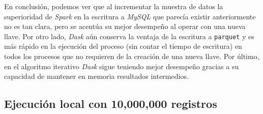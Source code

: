 En conclusión, podemos ver que al incrementar la muestra de datos la superioridad de \textit{Spark} en la escritura a \textit{MySQL} que parecía existir anteriormente no es tan clara, pero se acentúa su mejor desempeño al operar con una nueva llave. Por otro lado, \textit{Dask} aún conserva la ventaja de la escritura a \texttt{parquet} y es más rápido en la ejecución del proceso (sin contar el tiempo de escritura) en todos los procesos que no requieren de la creación de una nueva llave. Por último, en el algoritmo iterativo \textit{Dask} sigue teniendo mejor desempeño gracias a su capacidad de mantener en memoria resultados intermedios. 

\subsection{Ejecución local con 10,000,000 registros}

